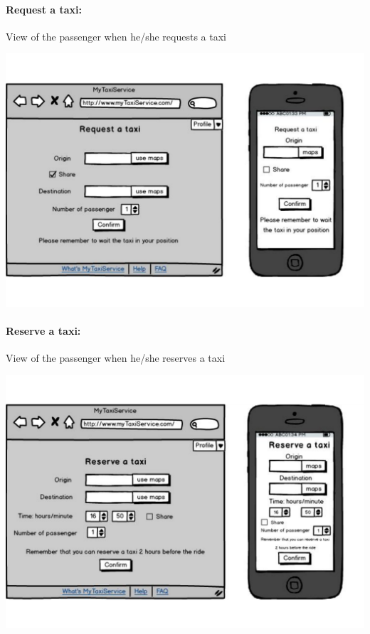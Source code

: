 \paragraph{Request a taxi:}
View of the passenger when he/she requests a taxi
\begin{center}
	\includegraphics[width=\textwidth]{mockup/request.pdf}
\end{center}

\paragraph{Reserve a taxi:}
View of the passenger when he/she reserves a taxi
\begin{center}
	\includegraphics[width=\textwidth]{mockup/reserve.pdf}
\end{center}

